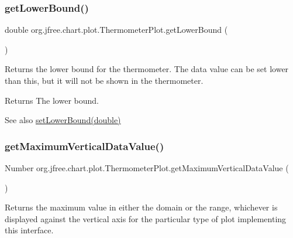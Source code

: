 \subsubsection{\texorpdfstring{get\+Lower\+Bound()}{getLowerBound()}}
{\footnotesize\ttfamily double org.\+jfree.\+chart.\+plot.\+Thermometer\+Plot.\+get\+Lower\+Bound (\begin{DoxyParamCaption}{ }\end{DoxyParamCaption})}

Returns the lower bound for the thermometer. The data value can be set lower than this, but it will not be shown in the thermometer.

\begin{DoxyReturn}{Returns}
The lower bound.
\end{DoxyReturn}
\begin{DoxySeeAlso}{See also}
\mbox{\hyperlink{classorg_1_1jfree_1_1chart_1_1plot_1_1_thermometer_plot_a06f3bbb5ab10b9ff9fb9a4a8ba4f70d9}{set\+Lower\+Bound(double)}} 
\end{DoxySeeAlso}
\mbox{\label{classorg_1_1jfree_1_1chart_1_1plot_1_1_thermometer_plot_abb6f97feaded1bc12aceddcfa4b1d07d}} 
\subsubsection{\texorpdfstring{get\+Maximum\+Vertical\+Data\+Value()}{getMaximumVerticalDataValue()}}
{\footnotesize\ttfamily Number org.\+jfree.\+chart.\+plot.\+Thermometer\+Plot.\+get\+Maximum\+Vertical\+Data\+Value (\begin{DoxyParamCaption}{ }\end{DoxyParamCaption})}

Returns the maximum value in either the domain or the range, whichever is displayed against the vertical axis for the particular type of plot implementing this interface.

